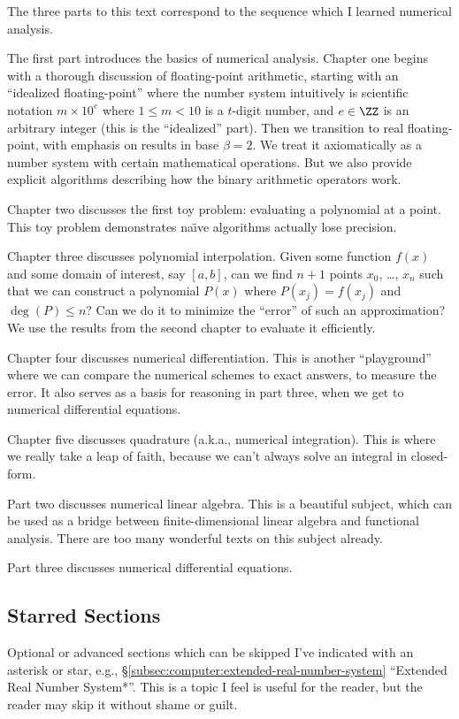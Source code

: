 The three parts to this text correspond to the sequence which I learned
numerical analysis.

The first part introduces the basics of numerical analysis. Chapter one begins
with a thorough discussion of floating-point arithmetic, starting with
an ``idealized floating-point'' where the number system intuitively
is scientific notation $m\times 10^{e}$ where $1\leq m<10$ is a
$t$-digit number, and $e\in\ZZ$ is an arbitrary integer (this is the
``idealized'' part). Then we transition to real 
floating-point, with emphasis on results in base $\beta=2$. We treat it
axiomatically as a number system with certain mathematical
operations. But we also provide explicit algorithms describing how the
binary arithmetic operators work.

Chapter two discusses the first toy problem: evaluating a polynomial at
a point. This toy problem demonstrates na\"{\i}ve algorithms actually
lose precision.

Chapter three discusses polynomial interpolation. Given some function
$f(x)$ and some domain of interest, say $[a,b]$, can we find $n+1$ points
$x_{0}$, \dots, $x_{n}$ such that we can construct a polynomial $P(x)$
where $P(x_{j})=f(x_{j})$ and $\deg(P)\leq n$? Can we do it to minimize
the ``error'' of such an approximation? We use the results from the
second chapter to evaluate it efficiently.

Chapter four discusses numerical differentiation. This is another
``playground'' where we can compare the numerical schemes to exact
answers, to measure the error. It also serves as a basis for reasoning
in part three, when we get to numerical differential equations.

Chapter five discusses quadrature (a.k.a., numerical integration).
This is where we really take a leap of faith, because we can't always
solve an integral in closed-form.

\bigbreak
Part two discusses numerical linear algebra. This is a beautiful
subject, which can be used as a bridge between finite-dimensional linear
algebra and functional analysis. There are too many wonderful texts on
this subject already.

\bigbreak
Part three discusses numerical differential equations.

\subsection*{Starred Sections}

Optional or advanced sections which can be skipped I've indicated with
an asterisk or star, e.g.,
\S\ref{subsec:computer:extended-real-number-system} ``Extended Real
Number System*''. This is a topic I feel is useful for the reader, but
the reader may skip it without shame or guilt.